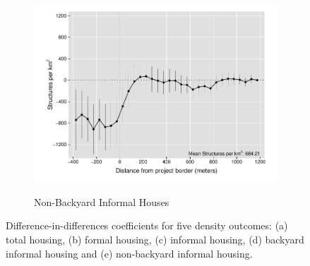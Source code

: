 \documentclass[12pt]{article}
\begin{document}
\begin{figure}[t!]
\begin{subfigure}[b]{0.49\textwidth}
            \label{fig:DDDbackyard}
        \end{subfigure}
        \vskip 1mm \vskip 0pt
        \begin{subfigure}[b]{.49\textwidth}  
            \centering
            \caption[]{\small Non-Backyard Informal Houses} 
            \vspace{-1mm}
            \includegraphics[width=\textwidth,trim={.5cm .3cm .3cm 0cm}, clip=true]{figures/distplotDDD_bblu_inf_non_backyard_admin}    
            \label{fig:DDDnonbackyard}
        \end{subfigure}
        \hfill \hspace{.02\textwidth}
        \begin{minipage}{0.47\textwidth}   
        \vspace{-6cm}
        \caption[]
        {\small Difference-in-differences coefficients for five density outcomes: (a) total housing, (b) formal housing, (c) informal housing, (d) backyard informal housing and (e) non-backyard informal housing.  } \label{fig:DDDbblu}
		\end{minipage}
    \end{figure} 
\end{document}
